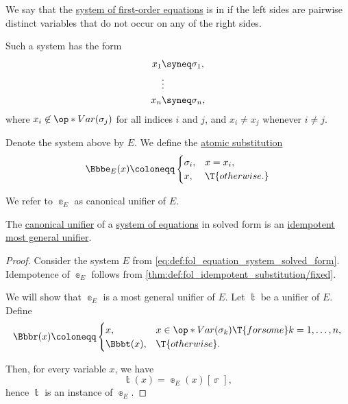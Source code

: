 \begin{definition}\label{def:fol_equation_system_solved_form}
  We say that the \hyperref[def:fol_equation/system]{system of first-order equations} is in  if the left sides are pairwise distinct variables that do not occur on any of the right sides.

  Such a system has the form
  \begin{equation}\label{eq:def:fol_equation_system_solved_form}
    \begin{aligned}
      x_1 &\syneq \sigma_1, \\
          &\vdots \\
      x_n &\syneq \sigma_n,
    \end{aligned}
  \end{equation}
  where \( x_i \not\in \op*{Var}(\sigma_j) \) for all indices \( i \) and \( j \), and \( x_i \neq x_j \) whenever \( i \neq j \).

  Denote the system above by \( E \). We define the \hyperref[def:atomic_fol_substitution]{atomic substitution}
  \begin{equation*}
    \Bbbe_E(x) \coloneqq \begin{cases}
      \sigma_i, &x = x_i, \\
      x,        &\T{otherwise.}
    \end{cases}
  \end{equation*}

  We refer to \( \Bbbe_E \) as  canonical unifier of \( E \).
\end{definition}

\begin{proposition}\label{thm:fol_canonical_unifier_is_most_general}
  The \hyperref[def:fol_equation_system_solved_form]{canonical unifier} of a \hyperref[def:fol_equation/system]{system of equations} in solved form is an \hyperref[def:fol_idempotent_substitution]{idempotent} \hyperref[def:fol_most_general_unifier]{most general unifier}.
\end{proposition}
\begin{proof}
  Consider the system \( E \) from \eqref{eq:def:fol_equation_system_solved_form}. Idempotence of \( \Bbbe_E \) follows from \cref{thm:def:fol_idempotent_substitution/fixed}.

  We will show that \( \Bbbe_E \) is a most general unifier of \( E \). Let \( \Bbbt \) be a unifier of \( E \). Define
  \begin{equation*}
    \Bbbr(x) \coloneqq \begin{cases}
      x,        &x \in \op*{Var}(\sigma_k) \T{for some} k = 1, \ldots, n, \\
      \Bbbt(x), &\T{otherwise}.
    \end{cases}
  \end{equation*}

  Then, for every variable \( x \), we have
  \begin{equation*}
    \Bbbt(x) = \Bbbe_E(x)[\Bbbr],
  \end{equation*}
  hence \( \Bbbt \) is an instance of \( \Bbbe_E \).
\end{proof}

